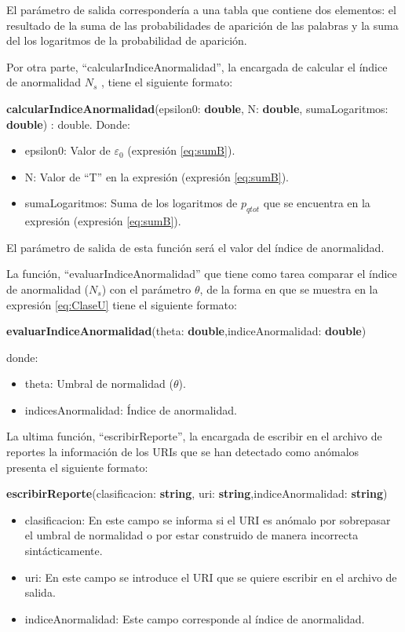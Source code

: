 El parámetro de salida correspondería a una tabla que contiene dos elementos: el resultado de la suma de las probabilidades de aparición de las
palabras y la suma del los logaritmos de la probabilidad de aparición.

Por otra parte, ``calcularIndiceAnormalidad'', la encargada de calcular
el  índice de anormalidad $N_{s}$ , tiene el siguiente formato:

\textbf{calcularIndiceAnormalidad}(epsilon0: \textbf{double}, N: \textbf{double}, sumaLogaritmos: \textbf{double}) : double. Donde:

\begin{itemize}
\item epsilon0: Valor de $\varepsilon_{0}$ (expresión \ref{eq:sumB}).
\item N: Valor de ``T'' en la expresión (expresión \ref{eq:sumB}).
\item sumaLogaritmos: Suma de los logaritmos de $p_{qtot}$ que se encuentra en la expresión (expresión \ref{eq:sumB}).
\end{itemize}

El parámetro de salida de esta función será el valor del  índice de anormalidad.

La función, ``evaluarIndiceAnormalidad'' que tiene como tarea comparar el  índice de anormalidad ($N_{s}$) con el parámetro $\theta$, de la forma en que se muestra en la expresión \ref{eq:ClaseU} tiene el siguiente formato:

\textbf{evaluarIndiceAnormalidad}(theta: \textbf{double},indiceAnormalidad: \textbf{double})

donde:
\begin{itemize}
\item theta: Umbral de normalidad ($\theta$).
\item indicesAnormalidad: Índice de anormalidad.
\end{itemize}

La ultima función, ``escribirReporte'', la encargada de escribir en el archivo de reportes la información de los URIs que se han detectado como
anómalos presenta el siguiente formato:

\textbf{escribirReporte}(clasificacion: \textbf{string},
uri: \textbf{string},indiceAnormalidad: \textbf{string})

\begin{itemize}
\item clasificacion: En este campo se informa si el URI es anómalo por sobrepasar el umbral de normalidad o por estar construido de manera
incorrecta sintácticamente.
\item uri: En este campo se introduce el URI que se quiere escribir en el
archivo de salida.
\item indiceAnormalidad: Este campo corresponde al índice de anormalidad.
\end{itemize}

